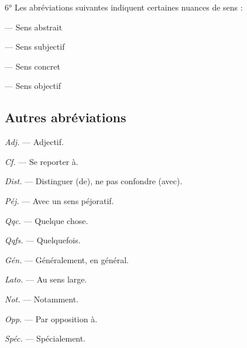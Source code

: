 6° Les abréviations suivantes indiquent certaines nuances de sens :

\vspace{0.211cm}
\hfill
\begin{minipage}[c]{.45\linewidth}
 — Sens abstrait

 — Sens subjectif

\end{minipage}
\hfill
\begin{minipage}[c]{.45\linewidth}
 — Sens concret

 — Sens objectif

\end{minipage}


\vspace{0.211cm}

\subsection {Autres abréviations}

\begin{minipage}[c]{.45\linewidth}
{\it Adj.} — Adjectif.

{\it Cf.} — Se reporter à.

{\it Dist.} — Distinguer (de), ne pas confondre (avec).

{\it Péj.} — Avec un sens péjoratif.

{\it Qqc.} — Quelque chose.

{\it Qqfs.} — Quelquefois.
\end{minipage}
\hfill
\begin{minipage}[c]{.45\linewidth}
{\it Gén.} — Généralement, en général.

{\it Lato.} — Au sens large.

{\it Not.} — Notamment.

{\it Opp.} — Par opposition à.

{\it Spéc.} — Spécialement.

\end{minipage}

